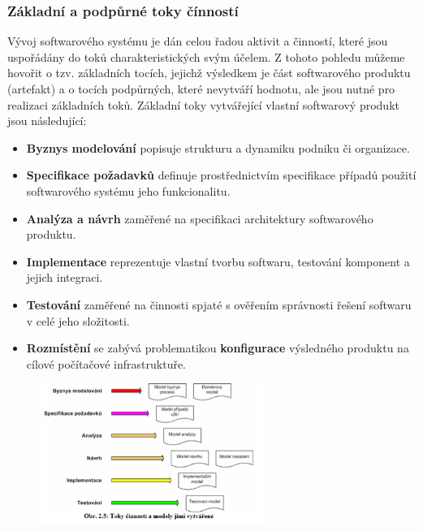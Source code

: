 \subsubsection{Základní a podpůrné toky čínností}
Vývoj softwarového systému je dán celou řadou aktivit a činností, které jsou uspořádány do toků charakteristických svým účelem.  Z tohoto pohledu můžeme hovořit o tzv. základních tocích, jejichž výsledkem je část softwarového produktu (artefakt) a o tocích podpůrných, které nevytváří hodnotu, ale jsou nutné pro realizaci základních toků. 
Základní toky vytvářející vlastní softwarový produkt jsou následující: 
\begin{itemize}
\item \textbf{Byznys modelování} popisuje strukturu a dynamiku podniku či organizace.
\item \textbf{Specifikace požadavků} definuje prostřednictvím specifikace případů použití softwarového systému jeho funkcionalitu.
\item \textbf{Analýza a návrh} zaměřené na specifikaci architektury softwarového produktu.
\item \textbf{Implementace} reprezentuje vlastní tvorbu softwaru, testování komponent a jejich integraci.
\item \textbf{Testování} zaměřené na činnosti spjaté s ověřením správnosti řešení softwaru v celé jeho složitosti.
\item \textbf{Rozmístění} se zabývá problematikou \textbf{konfigurace} výsledného produktu na cílové počítačové infrastruktuře. 
\end{itemize}

\begin{figure}[H]
	\centering
	\includegraphics[width=0.65\textwidth]{assets/toky_cinnosti.png}
\end{figure}

